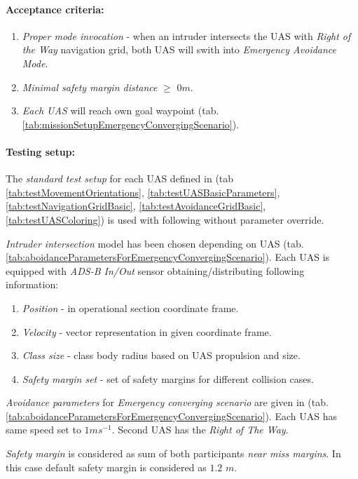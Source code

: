 \paragraph{Acceptance criteria:}
\begin{enumerate}
    \item \emph{Proper mode invocation} - when an intruder intersects the UAS  with \emph{Right of the Way} navigation grid, both UAS will swith into \emph{Emergency Avoidance Mode}.
    
    \item \emph{Minimal safety margin distance} $\ge$ $0 m$.
    
    \item \emph{Each UAS} will reach own goal waypoint (tab. \ref{tab:missionSetupEmergencyConvergingScenario}).
\end{enumerate}

\paragraph{Testing setup:} The \emph{standard test setup} for each UAS defined in (tab \ref{tab:testMovementOrientations}, \ref{tab:testUASBasicParameters}, \ref{tab:testNavigationGridBasic}, \ref{tab:testAvoidanceGridBasic}, \ref{tab:testUASColoring}) is used with following without parameter override.

\emph{Intruder intersection} model has been chosen depending on UAS (tab. \ref{tab:aboidanceParametersForEmergencyConvergingScenario}). Each UAS is equipped with \emph{ADS-B In/Out} sensor obtaining/distributing following information:
\begin{enumerate}
    \item \emph{Position} - in operational section coordinate frame.
    \item \emph{Velocity} - vector representation in given coordinate frame.
    \item \emph{Class size} - class body radius based on UAS propulsion and size.
    \item \emph{Safety margin set} - set of safety margins for different collision cases.
\end{enumerate}

\noindent \emph{Avoidance parameters} for \emph{Emergency converging scenario} are given in (tab. \ref{tab:aboidanceParametersForEmergencyConvergingScenario}). Each UAS has same speed set to $1 m s^{-1}$. Second UAS has the \emph{Right of The Way}. 

\emph{Safety margin} is considered as sum of both participants \emph{near miss margins}. In this case default safety margin is considered as $1.2$ $m$.

